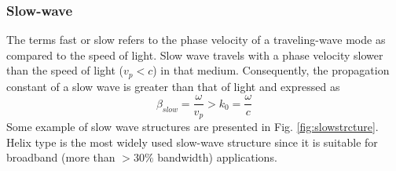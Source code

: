 \subsubsection{Slow-wave}
The terms fast or slow refers to the phase velocity of a traveling-wave mode as compared to the speed of light. Slow wave travels with a phase velocity slower than the speed of light ($v_p<c$) in that medium. Consequently, the propagation constant of a slow wave is greater than that of light and expressed as 
%
\begin{equation}
  \beta_{slow} = \dfrac{\omega}{v_p}  > k_0= \dfrac{\omega}{c} 
\end{equation}
%
Some example of slow wave structures are presented in Fig. \ref{fig:slowstrcture}. Helix type is the most widely used slow-wave structure since it is suitable for broadband (more than $>30\%$ bandwidth) applications. 

